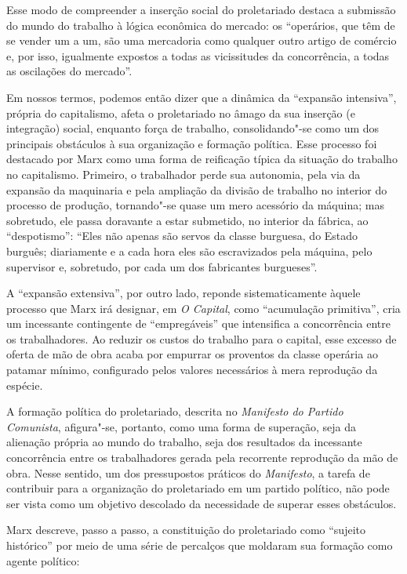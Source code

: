 Esse modo de compreender a inserção social do proletariado destaca a
submissão do mundo do trabalho à lógica econômica do mercado: os
“operários, que têm de se vender um a um, são uma mercadoria como
qualquer outro artigo de comércio e, por isso, igualmente expostos a
todas as vicissitudes da concorrência, a todas as oscilações do
mercado”.

Em nossos termos, podemos então dizer que a dinâmica da “expansão
intensiva”, própria do capitalismo, afeta o proletariado no âmago da sua
inserção (e integração) social, enquanto força de trabalho,
consolidando"-se como um dos principais obstáculos à sua organização e
formação política. Esse processo foi destacado por Marx como uma forma
de reificação típica da situação do trabalho no capitalismo. Primeiro,
o trabalhador perde sua autonomia, pela via da expansão da maquinaria e
pela ampliação da divisão de trabalho no interior do processo de
produção, tornando"-se quase um mero acessório da máquina; mas
sobretudo, ele passa doravante a estar submetido, no interior da
fábrica, ao “despotismo”: “Eles não apenas são servos da classe
burguesa, do Estado burguês; diariamente e a cada hora eles são
escravizados pela máquina, pelo supervisor e, sobretudo, por cada um
dos fabricantes burgueses”.

A “expansão extensiva”, por outro lado, reponde sistematicamente àquele
processo que Marx irá designar, em \textit{O Capital}, como “acumulação
primitiva”, cria um incessante contingente de “empregáveis” que
intensifica a concorrência entre os trabalhadores. Ao reduzir os custos
do trabalho para o capital, esse excesso de oferta de mão de obra
acaba por empurrar os proventos da classe operária ao patamar mínimo,
configurado pelos valores necessários à mera reprodução da espécie.

A formação política do proletariado, descrita no \textit{Manifesto do
Partido Comunista}, afigura"-se, portanto, como uma forma de superação,
seja da alienação própria ao mundo do trabalho, seja dos resultados da
incessante concorrência entre os trabalhadores gerada pela recorrente
reprodução da mão de obra. Nesse sentido, um dos pressupostos
práticos do \textit{Manifesto}, a tarefa de contribuir para a
organização do proletariado em um partido político, não pode ser vista
como um objetivo descolado da necessidade de superar esses obstáculos.

Marx descreve, passo a passo, a constituição do proletariado como
“sujeito histórico” por meio de uma série de percalços que moldaram sua
formação como agente político: 

